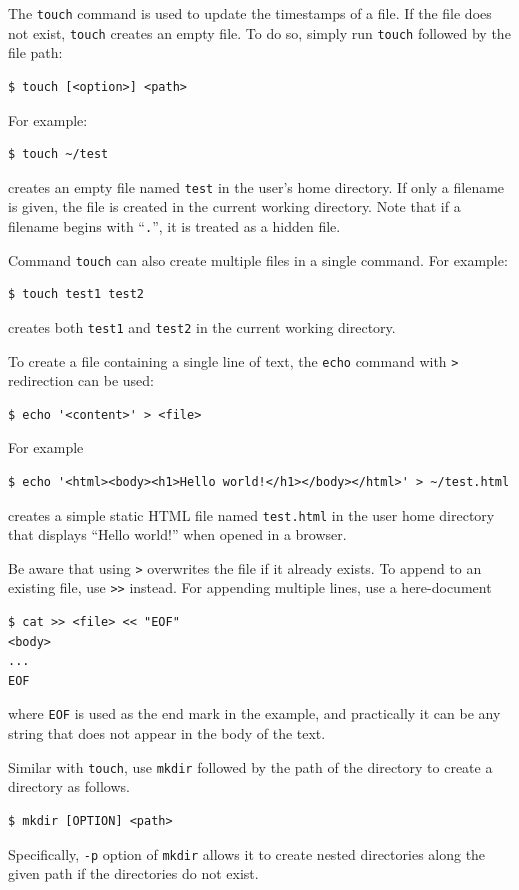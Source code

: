 The \verb|touch| command is used to update the timestamps of a file. If the file does not exist, \verb|touch| creates an empty file. To do so, simply run \verb|touch| followed by the file path:
\begin{lstlisting}
$ touch [<option>] <path>
\end{lstlisting}

For example:
\begin{lstlisting}
$ touch ~/test
\end{lstlisting}
creates an empty file named \texttt{test} in the user’s home directory. If only a filename is given, the file is created in the current working directory. Note that if a filename begins with ``\verb|.|'', it is treated as a hidden file.

Command \verb|touch| can also create multiple files in a single command. For example:
\begin{lstlisting}
$ touch test1 test2
\end{lstlisting}
creates both \texttt{test1} and \texttt{test2} in the current working directory.

To create a file containing a single line of text, the \verb|echo| command with \verb|>| redirection can be used:
\begin{lstlisting}
$ echo '<content>' > <file>
\end{lstlisting}

For example
\begin{lstlisting}
$ echo '<html><body><h1>Hello world!</h1></body></html>' > ~/test.html
\end{lstlisting}
creates a simple static HTML file named \texttt{test.html} in the user home directory that displays ``Hello world!'' when opened in a browser. 

Be aware that using \verb|>| overwrites the file if it already exists. To append to an existing file, use \verb|>>| instead. For appending multiple lines, use a here-document
\begin{lstlisting}
$ cat >> <file> << "EOF"
<body>
...
EOF
\end{lstlisting}
where \verb|EOF| is used as the end mark in the example, and practically it can be any string that does not appear in the body of the text.

Similar with \verb|touch|, use \verb|mkdir| followed by the path of the directory to create a directory as follows.
\begin{lstlisting}
$ mkdir [OPTION] <path>
\end{lstlisting}
Specifically, \verb|-p| option of \verb|mkdir| allows it to create nested directories along the given path if the directories do not exist.

